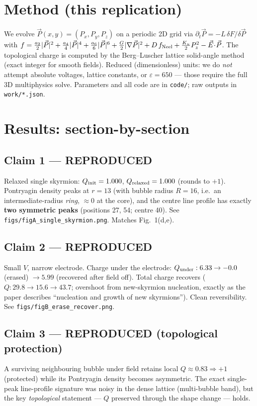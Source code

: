 \documentclass[11pt]{article}
\begin{document}
\section{Method (this replication)}
We evolve $\vec P(x,y)=(P_x,P_y,P_z)$ on a periodic 2D grid via
$\partial_t\vec P=-L\,\delta F/\delta\vec P$ with
$f=\tfrac{a_2}{2}|\vec P|^2+\tfrac{a_4}{4}|\vec P|^4+\tfrac{a_6}{6}|\vec P|^6
+\tfrac{G}{2}|\nabla\vec P|^2+D\,f_{\rm Neel}+\tfrac{K_u}{2}P_z^2-\vec E\!\cdot\!\vec P$.
The topological charge is computed by the Berg--Luscher lattice solid-angle method
(exact integer for smooth fields). Reduced (dimensionless) units: we do
\emph{not} attempt absolute voltages, lattice constants, or $\varepsilon=650$
--- those require the full 3D multiphysics solve. Parameters and all code are in
\texttt{code/}; raw outputs in \texttt{work/*.json}.

\section{Results: section-by-section}

\subsection*{Claim 1 --- REPRODUCED}
Relaxed single skyrmion: $Q_{\rm init}=1.000$, $Q_{\rm relaxed}=1.000$ (rounds to
$+1$). Pontryagin density peaks at $r=13$ (with bubble radius $R=16$, i.e.\ an
intermediate-radius \emph{ring}, $\approx0$ at the core), and the centre line
profile has exactly \textbf{two symmetric peaks} (positions 27, 54; centre 40).
See \texttt{figs/figA\_single\_skyrmion.png}. Matches Fig.~1(d,e).

\subsection*{Claim 2 --- REPRODUCED}
Small $V$, narrow electrode. Charge under the electrode:
$Q_{\rm under}: 6.33 \to -0.0$ (erased) $\to 5.99$ (recovered after field off).
Total charge recovers ($Q: 29.8\to15.6\to43.7$; overshoot from new-skyrmion
nucleation, exactly as the paper describes ``nucleation and growth of new
skyrmions''). Clean reversibility. See \texttt{figs/figB\_erase\_recover.png}.

\subsection*{Claim 3 --- REPRODUCED (topological protection)}
A surviving neighbouring bubble under field retains local $Q\approx0.83\Rightarrow+1$
(protected) while its Pontryagin density becomes asymmetric. The exact single-peak
line-profile signature was noisy in the dense lattice (multi-bubble band), but the
key \emph{topological} statement --- $Q$ preserved through the shape change --- holds.
\end{document}
